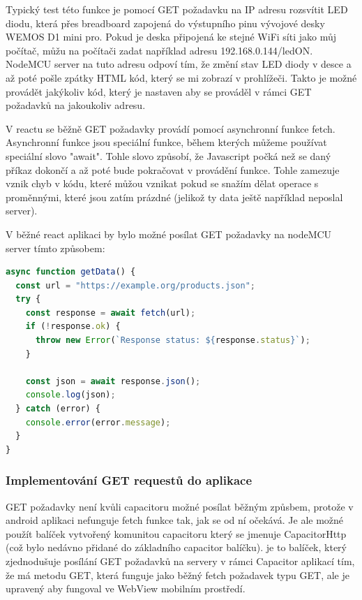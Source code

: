 Typický test této funkce je pomocí GET požadavku na IP adresu rozsvítit LED diodu, která přes breadboard zapojená do výstupního pinu vývojové desky WEMOS D1 mini pro. Pokud je deska připojená ke stejné WiFi síti jako můj počítač, můžu na počítači zadat například adresu 192.168.0.144/ledON. NodeMCU server na tuto adresu odpoví tím, že změní stav LED diody v desce a až poté pošle zpátky HTML kód, který se mi zobrazí v prohlížeči. Takto je možné provádět jakýkoliv kód, který je nastaven aby se prováděl v rámci GET požadavků na jakoukoliv adresu.

V reactu se běžně GET požadavky provádí pomocí asynchronní funkce fetch. Asynchronní funkce jsou speciální funkce, během kterých můžeme používat speciální slovo "await". Tohle slovo způsobí, že Javascript počká než se daný příkaz dokončí a až poté bude pokračovat v provádění funkce. Tohle zamezuje vznik chyb v kódu, které můžou vznikat pokud se snažím dělat operace s proměnnými, které jsou zatím prázdné (jelikož ty data ještě například neposlal server).

V běžné react aplikaci by bylo možné posílat GET požadavky na nodeMCU server tímto způsobem:

\begin{lstlisting}[language=JavaScript, caption={Základní způsob posílání GET požadavků v JavaScriptu}, label={lst:JavaScriptFetchFunkce}]
async function getData() {
  const url = "https://example.org/products.json";
  try {
    const response = await fetch(url);
    if (!response.ok) {
      throw new Error(`Response status: ${response.status}`);
    }

    const json = await response.json();
    console.log(json);
  } catch (error) {
    console.error(error.message);
  }
}
\end{lstlisting}


\subsubsection{Implementování GET requestů do aplikace}

GET požadavky není kvůli capacitoru možné posílat běžným způsbem, protože v android aplikaci nefunguje fetch funkce tak, jak se od ní očekává. Je ale možné použít balíček vytvořený komunitou capacitoru který se jmenuje CapacitorHttp (což bylo nedávno přidané do základního capacitor balíčku). je to balíček, který zjednodušuje posílání GET požadavků na servery v rámci Capacitor aplikací tím, že má metodu GET, která funguje jako běžný fetch požadavek typu GET, ale je upravený aby fungoval ve WebView mobilním prostředí.

